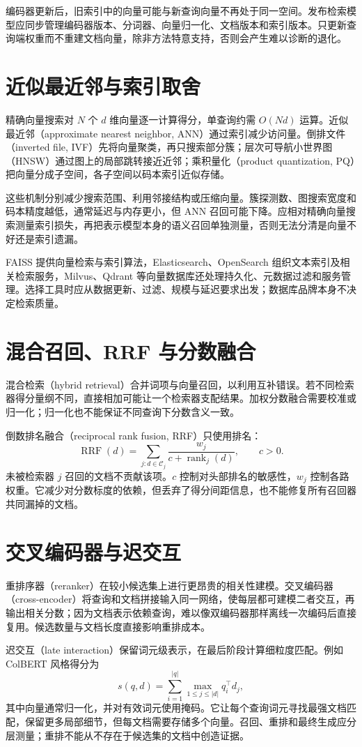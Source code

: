 编码器更新后，旧索引中的向量可能与新查询向量不再处于同一空间。发布检索模型应同步管理编码器版本、分词器、向量归一化、文档版本和索引版本。只更新查询端权重而不重建文档向量，除非方法特意支持，否则会产生难以诊断的退化。

\section{近似最近邻与索引取舍}

精确向量搜索对 $N$ 个 $d$ 维向量逐一计算得分，单查询约需 $O(Nd)$ 运算。近似最近邻（approximate nearest neighbor, ANN）通过索引减少访问量。倒排文件（inverted file, IVF）先将向量聚类，再只搜索部分簇；层次可导航小世界图（HNSW）通过图上的局部跳转接近近邻；乘积量化（product quantization, PQ）把向量分成子空间，各子空间以码本索引近似存储。

这些机制分别减少搜索范围、利用邻接结构或压缩向量。簇探测数、图搜索宽度和码本精度越低，通常延迟与内存更小，但 ANN 召回可能下降。应相对精确向量搜索测量索引损失，再把表示模型本身的语义召回单独测量，否则无法分清是向量不好还是索引遗漏。

FAISS 提供向量检索与索引算法，Elasticsearch、OpenSearch 组织文本索引及相关检索服务，Milvus、Qdrant 等向量数据库还处理持久化、元数据过滤和服务管理。选择工具时应从数据更新、过滤、规模与延迟要求出发；数据库品牌本身不决定检索质量。

\section{混合召回、RRF 与分数融合}

混合检索（hybrid retrieval）合并词项与向量召回，以利用互补错误。若不同检索器得分量纲不同，直接相加可能让一个检索器支配结果。加权分数融合需要校准或归一化；归一化也不能保证不同查询下分数含义一致。

倒数排名融合（reciprocal rank fusion, RRF）只使用排名：
\[
\operatorname{RRF}(d)=\sum_{j:d\in\mathcal C_j}\frac{w_j}{c+\operatorname{rank}_j(d)},\qquad c>0.
\]
未被检索器 $j$ 召回的文档不贡献该项。$c$ 控制对头部排名的敏感性，$w_j$ 控制各路权重。它减少对分数标度的依赖，但丢弃了得分间距信息，也不能修复所有召回器共同漏掉的文档。

\section{交叉编码器与迟交互}

重排序器（reranker）在较小候选集上进行更昂贵的相关性建模。交叉编码器（cross-encoder）将查询和文档拼接输入同一网络，使每层都可建模二者交互，再输出相关分数；因为文档表示依赖查询，难以像双编码器那样离线一次编码后直接复用。候选数量与文档长度直接影响重排成本。

迟交互（late interaction）保留词元级表示，在最后阶段计算细粒度匹配。例如 ColBERT 风格得分为
\[
s(q,d)=\sum_{i=1}^{|q|}\max_{1\le j\le|d|}q_i^\top d_j,
\]
其中向量通常归一化，并对有效词元使用掩码。它让每个查询词元寻找最强文档匹配，保留更多局部细节，但每文档需要存储多个向量\cite{colbert}。召回、重排和最终生成应分层测量；重排不能从不存在于候选集的文档中创造证据。

